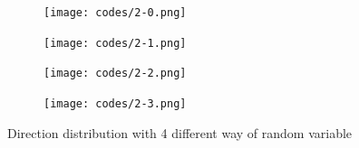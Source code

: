 \documentclass[paper=a4, fontsize=11pt]{scrartcl} %
\numberwithin{equation}{section} %
\numberwithin{figure}{section} %
\numberwithin{table}{section} %
\begin{document}
\begin{figure}[!ht]
	\centering
	\begin{subfigure}[b]{0.495\textwidth}
		\centering
		\texttt{[image: codes/2-0.png]}
		\caption{}
	\end{subfigure}
	\begin{subfigure}[b]{0.495\textwidth}
		\centering
		\texttt{[image: codes/2-1.png]}
		\caption{}
    \end{subfigure}
	\begin{subfigure}[b]{0.495\textwidth}
		\centering
		\texttt{[image: codes/2-2.png]}
		\caption{}
    \end{subfigure}
    \begin{subfigure}[b]{0.495\textwidth}
		\centering
		\texttt{[image: codes/2-3.png]}
		\caption{}
	\end{subfigure}
	\caption{Direction distribution with 4 different way of random variable }
	\label{fig:2}
\end{figure}
\end{document}
